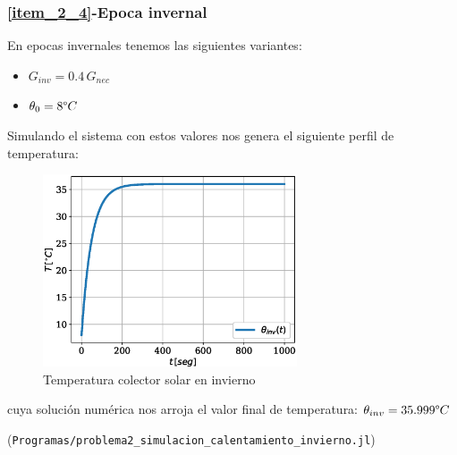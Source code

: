 \subsubsection{\ref{item_2_4}-Epoca invernal}
En epocas invernales tenemos las siguientes variantes:

\begin{itemize}
   \item $G_{inv}=0.4\,G_{nec}$
   \item $\theta_{0} = 8 \degree C$
\end{itemize}
Simulando el sistema con estos valores nos genera el siguiente perfil de temperatura:

\begin{figure}[H]
   \centering
   \includegraphics[width=0.67\textwidth]{Images/temperatura_colector_invierno.eps}
   \caption{Temperatura colector solar en invierno}\label{fig:colector_temperatura_invierno}
\end{figure}

cuya solución numérica nos arroja el valor final de temperatura: $\theta_{inv} = 35.999 \degree C$

(\verb|Programas/problema2_simulacion_calentamiento_invierno.jl|)


